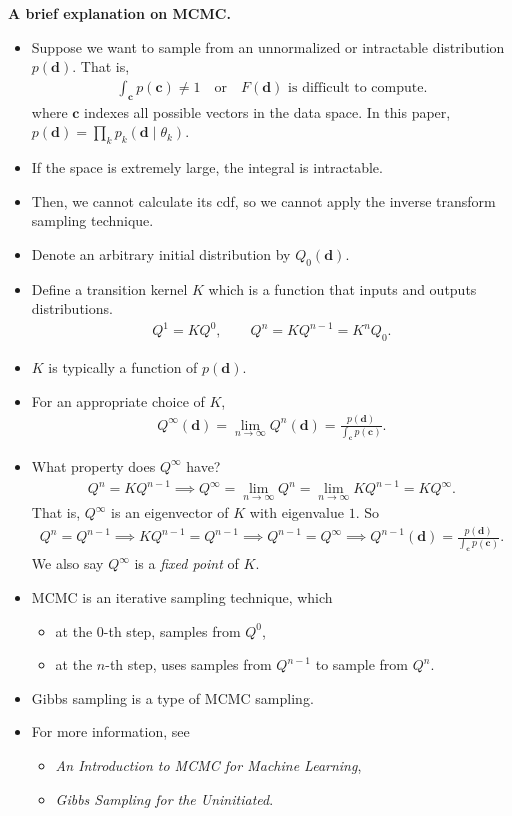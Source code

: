 \documentclass[10pt]{article}
\begin{document}
\textbf{A brief explanation on MCMC.}
\begin{itemize}
\item Suppose we want to sample from an unnormalized or intractable distribution $p(\mathbf{d})$. That is,
\begin{align*}
\int_\mathbf{c} p(\mathbf{c}) \neq 1 \quad \text{or} \quad F(\mathbf{d}) \text{ is difficult to compute}.
\end{align*}
where $\mathbf{c}$ indexes all possible vectors in the data space. In this paper, $p(\mathbf{d}) = \prod_k p_k(\mathbf{d} \mid \theta_k)$.
\item If the space is extremely large, the integral is intractable.
\item Then, we cannot calculate its cdf, so we cannot apply the inverse transform sampling technique.
\item Denote an arbitrary initial distribution by $Q_0(\mathbf{d})$.
\item Define a transition kernel $K$ which is a function that inputs and outputs distributions.
\begin{align*}
Q^1 = K Q^0, \qquad Q^n = K Q^{n - 1} =  K^n Q_0.
\end{align*}
\item $K$ is typically a function of $p(\mathbf{d})$.
\item For an appropriate choice of $K$,
\begin{align*}
Q^\infty(\mathbf{d}) = \lim_{n \rightarrow \infty} Q^n(\mathbf{d}) = \frac{p(\mathbf{d})}{\int_\mathbf{c} p(\mathbf{c})}.
\end{align*}
\item What property does $Q^\infty$ have?
\begin{align*}
Q^n = KQ^{n - 1} \implies Q^\infty = \lim_{n \rightarrow \infty} Q^n = \lim_{n \rightarrow \infty} KQ^{n - 1} = KQ^\infty.
\end{align*}
That is, $Q^\infty$ is an eigenvector of $K$ with eigenvalue $1$. So
\begin{align*}
Q^n = Q^{n - 1} \implies KQ^{n - 1} = Q^{n - 1} \implies Q^{n - 1} = Q^\infty \implies Q^{n - 1}(\mathbf{d}) = \frac{p(\mathbf{d})}{\int_\mathbf{c} p(\mathbf{c})}.
\end{align*}
We also say $Q^\infty$ is a \textit{fixed point} of $K$.
\item MCMC is an iterative sampling technique, which
\begin{itemize}
\item at the $0$-th step, samples from $Q^0$,
\item at the $n$-th step, uses samples from $Q^{n - 1}$ to sample from $Q^n$.
\end{itemize}
\item Gibbs sampling is a type of MCMC sampling.
\item For more information, see
\begin{itemize}
\item \textit{An Introduction to MCMC for Machine Learning},
\item \textit{Gibbs Sampling for the Uninitiated}.
\end{itemize}
\end{itemize}
\end{document}
